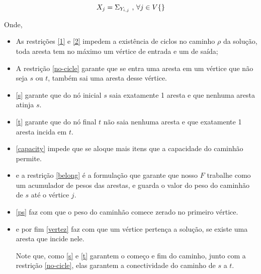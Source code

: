 \documentclass[conference]{IEEEtran}
\begin{document}
    \begin{equation}
        X_j = \Sigma_{Y_{i,j}} \text{ , } \forall j \in V \\ \{\}
        \label{vertez}
    \end{equation}

    Onde,

    \begin{itemize}
        \item As restrições \ref{1} e \ref{2} impedem a existência de ciclos no caminho $\rho$ da solução, toda aresta tem no máximo um vértice de entrada e um de saída;

        \item A restrição \ref{no-cicle} garante que se entra uma aresta em um vértice que não seja $s$ ou $t$, também sai uma aresta desse vértice.

        \item \ref{s} garante que do nó inicial $s$ saia  exatamente 1 aresta e que nenhuma aresta atinja  $s$.
        \item \ref{t} garante que do nó final $t$ não saia nenhuma aresta e que exatamente 1 aresta incida em $t$.

        \item \ref{capacity} impede que se aloque mais itens que a capacidade do caminhão permite.

        \item e a restrição \ref{belong} é a formulação que garante que nosso $F$ trabalhe como um acumulador de pesos das arestas, e guarda o valor do peso do caminhão de $s$ até o vértice $j$.

        \item \ref{ps} faz com que o peso do caminhão comece zerado no primeiro vértice.

        \item e por fim \ref{vertez} faz com que um vértice pertença a solução, se existe uma aresta que incide nele.

    Note que, como \ref{s} e \ref{t} garantem o começo e fim do caminho, junto com a restrição \ref{no-cicle}, elas garantem a conectividade do caminho de $s$ a $t$.

    \end{itemize}
\end{document}
